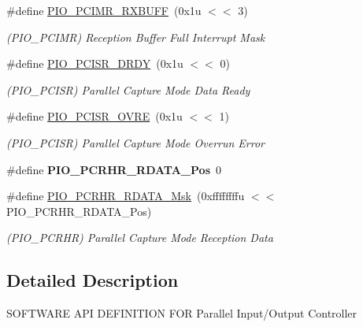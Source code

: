 \begin{DoxyCompactItemize}
\mbox{\label{group__SAMV71__PIO_gace0229eb93a901d24a611808e426cceb}} 
\#define \mbox{\hyperlink{group__SAMV71__PIO_gace0229eb93a901d24a611808e426cceb}{P\+I\+O\+\_\+\+P\+C\+I\+M\+R\+\_\+\+R\+X\+B\+U\+FF}}~(0x1u $<$$<$ 3)
\begin{DoxyCompactList}\small\item\em (P\+I\+O\+\_\+\+P\+C\+I\+MR) Reception Buffer Full Interrupt Mask \end{DoxyCompactList}\item 
\mbox{\label{group__SAMV71__PIO_ga35485537fe6597c3f95002a695d64831}} 
\#define \mbox{\hyperlink{group__SAMV71__PIO_ga35485537fe6597c3f95002a695d64831}{P\+I\+O\+\_\+\+P\+C\+I\+S\+R\+\_\+\+D\+R\+DY}}~(0x1u $<$$<$ 0)
\begin{DoxyCompactList}\small\item\em (P\+I\+O\+\_\+\+P\+C\+I\+SR) Parallel Capture Mode Data Ready \end{DoxyCompactList}\item 
\mbox{\label{group__SAMV71__PIO_ga0808c9547c0eca170ce722d5e15feb03}} 
\#define \mbox{\hyperlink{group__SAMV71__PIO_ga0808c9547c0eca170ce722d5e15feb03}{P\+I\+O\+\_\+\+P\+C\+I\+S\+R\+\_\+\+O\+V\+RE}}~(0x1u $<$$<$ 1)
\begin{DoxyCompactList}\small\item\em (P\+I\+O\+\_\+\+P\+C\+I\+SR) Parallel Capture Mode Overrun Error \end{DoxyCompactList}\item 
\mbox{\label{group__SAMV71__PIO_ga2fd7a9e615c2956f974c78e6e5487ff0}} 
\#define {\bfseries P\+I\+O\+\_\+\+P\+C\+R\+H\+R\+\_\+\+R\+D\+A\+T\+A\+\_\+\+Pos}~0
\item 
\mbox{\label{group__SAMV71__PIO_ga98d9be011be6ed70f1a6f73f44f0820c}} 
\#define \mbox{\hyperlink{group__SAMV71__PIO_ga98d9be011be6ed70f1a6f73f44f0820c}{P\+I\+O\+\_\+\+P\+C\+R\+H\+R\+\_\+\+R\+D\+A\+T\+A\+\_\+\+Msk}}~(0xffffffffu $<$$<$ P\+I\+O\+\_\+\+P\+C\+R\+H\+R\+\_\+\+R\+D\+A\+T\+A\+\_\+\+Pos)
\begin{DoxyCompactList}\small\item\em (P\+I\+O\+\_\+\+P\+C\+R\+HR) Parallel Capture Mode Reception Data \end{DoxyCompactList}\end{DoxyCompactItemize}


\subsection{Detailed Description}
S\+O\+F\+T\+W\+A\+RE A\+PI D\+E\+F\+I\+N\+I\+T\+I\+ON F\+OR Parallel Input/\+Output Controller 